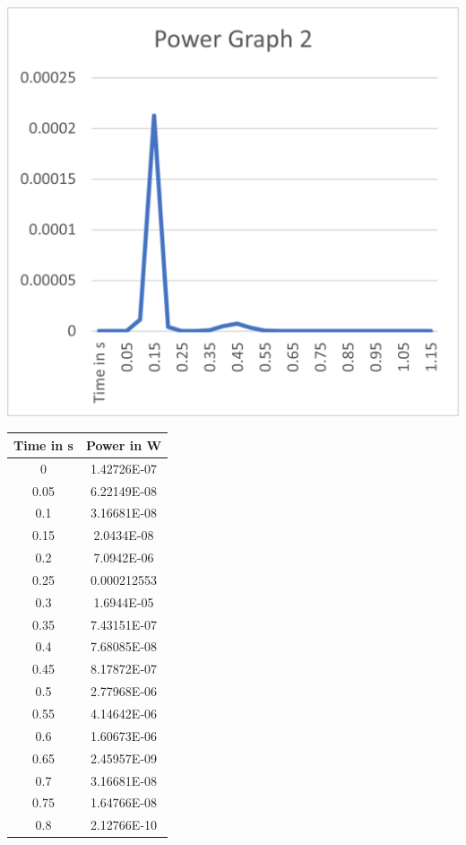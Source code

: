 \begin{minipage}{0.5\textwidth}
    \includegraphics[width=\textwidth]{./Figure_15.png}
    \label{fig:Power Graph 2}
\end{minipage}
\begin{minipage}{0.5\textwidth}
    \center
        \begin{tabular}{|c|c|}
            \hline
            Time in s & Power in W\\
            \hline
            0 & 1.42726E-07\\
            \hline
            0.05 & 6.22149E-08\\
            \hline
            0.1	& 3.16681E-08\\
            \hline
            0.15 & 2.0434E-08\\
            \hline
            0.2	& 7.0942E-06\\
            \hline
            0.25 & 0.000212553\\
            \hline
            0.3	& 1.6944E-05\\
            \hline
            0.35 & 7.43151E-07\\
            \hline
            0.4	& 7.68085E-08\\
            \hline
            0.45 & 8.17872E-07\\
            \hline
            0.5	& 2.77968E-06\\
            \hline
            0.55 & 4.14642E-06\\
            \hline
            0.6	& 1.60673E-06\\
            \hline
            0.65 & 2.45957E-09\\
            \hline
            0.7	& 3.16681E-08\\
            \hline
            0.75 & 1.64766E-08\\
            \hline
            0.8	& 2.12766E-10\\
            \hline
        \end{tabular}
        \label{Tab:Values of Power Graph 3}
\end{minipage}
